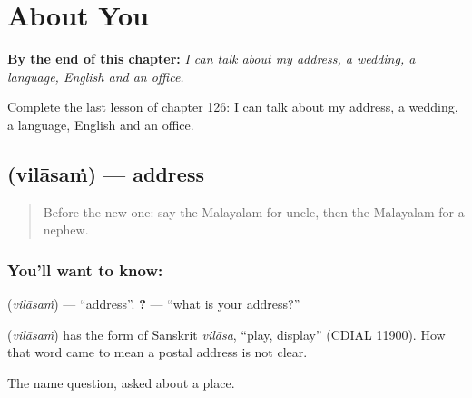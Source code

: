 
\chapter{About You}
\label{ch:ml-about-you}

\begin{chapteropening}
\textbf{By the end of this chapter:} \emph{I can talk about my address, a wedding, a language, English and an office.}

Complete the last lesson of chapter 126: I can talk about my address, a wedding, a language, English and an office.
\end{chapteropening}

\section[\texorpdfstring{\ml{വിലാസം} (vilāsaṁ)}{വിലാസം (vilāsaṁ)}]{ (vilāsaṁ) — address}

\label{lesson:ML-C126-address}



\begin{quote}
Before the new one: say the Malayalam for uncle, then the Malayalam for a nephew.
\end{quote}

\subsection*{You'll want to know: }
\textbf{} (\emph{vilāsaṁ}) — \textquotedblleft{}address\textquotedblright{}. \textbf{  ?} — \textquotedblleft{}what is your address?\textquotedblright{}

\begin{cousinweb}
\textbf{} (\emph{vilāsaṁ}) has the form of Sanskrit \emph{vilāsa}, \textquotedblleft{}play, display\textquotedblright{} (CDIAL 11900). How that word came to mean a postal address is not clear.
\end{cousinweb}

\begin{grammarlens}[title={What you've built}]
The name question, asked about a place.
\end{grammarlens}

